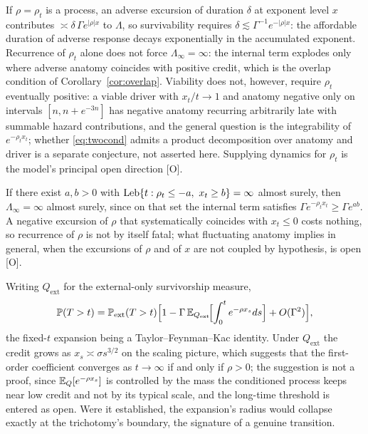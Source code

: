 \begin{remark}\label{rem:fluct}
If $\rho=\rho_t$ is a process, an adverse excursion of duration
$\delta$ at exponent level $x$ contributes
$\asymp\delta\,\Gamma e^{|\rho|x}$ to $\Lambda$, so survivability
requires $\delta\lesssim\Gamma^{-1}e^{-|\rho|x}$: the affordable
duration of adverse response decays exponentially in the accumulated
exponent. Recurrence of $\rho_t$ alone does not force
$\Lambda_\infty=\infty$: the internal term explodes only where adverse
anatomy coincides with positive credit, which is the overlap condition
of Corollary~\ref{cor:overlap}. Viability does not, however, require $\rho_t$ eventually positive: a viable driver with $x_t/t \to 1$ and anatomy negative only on intervals $[n, n + e^{-3n}]$ has negative anatomy recurring arbitrarily late with summable hazard contributions, and the general question is the integrability of $e^{-\rho_t x_t}$; whether \eqref{eq:twocond} admits a product decomposition over anatomy and driver is a separate conjecture, not asserted here. Supplying dynamics for
$\rho_t$ is the model's principal open direction [O].
\end{remark}

\begin{corollary}\label{cor:overlap}
If there exist $a,b>0$ with
$\operatorname{Leb}\{t:\rho_t\le-a,\ x_t\ge b\}=\infty$ almost surely, then
$\Lambda_\infty=\infty$ almost surely, since on that set the internal
term satisfies $\Gamma e^{-\rho_tx_t}\ge\Gamma e^{ab}$. A negative
excursion of $\rho$ that systematically coincides with $x_t\le0$ costs
nothing, so recurrence of $\rho$ is not by itself fatal; what
fluctuating anatomy implies in general, when the excursions of $\rho$
and of $x$ are not coupled by hypothesis, is open [O].
\end{corollary}

\begin{proposition}\label{prop:perturb}
Writing $Q_{\mathrm{ext}}$ for the external-only survivorship measure,
\begin{equation}\label{eq:perturb}
\mathbb{P}(T>t)=\mathbb{P}_{\mathrm{ext}}(T>t)\Bigl[1-\Gamma\,
\mathbb{E}_{Q_{\mathrm{ext}}}\!\Bigl[\int_0^te^{-\rho x_s}ds\Bigr]
+O(\Gamma^{2})\Bigr],
\end{equation}
the fixed-$t$ expansion being a Taylor--Feynman--Kac identity. Under
$Q_{\mathrm{ext}}$ the credit grows as $x_s\asymp\sigma s^{3/2}$ on
the scaling picture, which suggests that the first-order coefficient
converges as $t\to\infty$ if and only if $\rho>0$; the suggestion is
not a proof, since $\mathbb{E}_Q[e^{-\rho x_s}]$ is controlled by the mass the
conditioned process keeps near low credit and not by its typical
scale, and the long-time threshold is entered as open. Were it
established, the expansion's radius would collapse exactly at the
trichotomy's boundary, the signature of a genuine transition.
\end{proposition}

